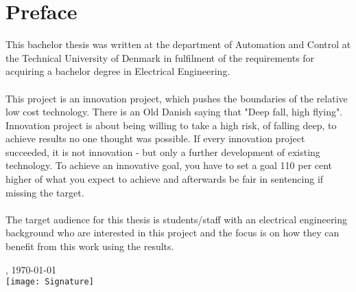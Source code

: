\chapter{Preface}
This bachelor thesis was written at the department of Automation and Control at the Technical University of Denmark in fulfilment of the requirements for acquiring a bachelor degree in Electrical Engineering.\\
\\
\noindent
This project is an innovation project, which pushes the boundaries of the relative low cost technology. There is an Old Danish saying that "Deep fall, high flying". Innovation project is about being willing to take a high risk, of falling deep, to achieve results no one thought was possible. If every innovation project succeeded, it is not innovation - but only a further development of existing technology. To achieve an innovative goal, you have to set a goal 110 per cent higher of what you expect to achieve and afterwards be fair in sentencing if missing the target.\\
\\
\noindent
The target audience for this thesis is students/staff with an electrical engineering background who are interested in this project and the focus is on how they can benefit from this work using the results.    

\vfill

{
\centering
    \thesislocation{}, \today\\[1cm]
    \hspace{3cm}\texttt{[image: Signature]}\\[1cm]
\begin{flushright}
    \thesisauthor{}
\end{flushright}
}